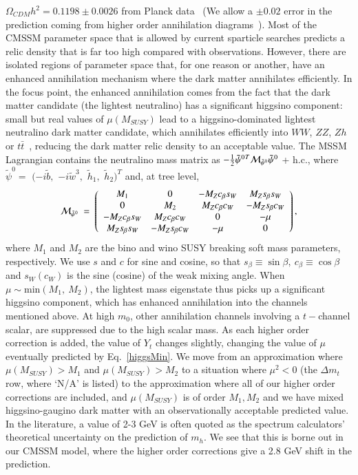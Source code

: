 \documentclass[final,3p,times,pdflatex]{elsarticle}
\begin{document}
$\Omega_{CDM} h^2=0.1198 \pm 0.0026$ from Planck data~\cite{Ade:2013zuv} (We
allow a $\pm 0.02$ error in the prediction coming from higher order
annihilation diagrams~\cite{Baro:2009na}).
Most of the CMSSM parameter space that is allowed by current sparticle
searches predicts a relic density that is far too high compared with
observations. However, there are isolated regions of parameter space that, for
one reason or another, have an enhanced annihilation mechanism where the dark
matter annihilates efficiently. In the focus point, the enhanced annihilation
comes from the fact that the dark matter candidate (the lightest neutralino)
has a significant higgsino component: small but real
values of $\mu(M_{SUSY})$ lead to a higgsino-dominated lightest neutralino dark
matter candidate, which annihilates efficiently into $WW$, $ZZ$, $Zh$ or $t
\bar t$~\cite{Feng:2000gh}, reducing the dark matter relic density to an
acceptable value. 
The MSSM Lagrangian contains the neutralino mass matrix as
$-\frac{1}{2}
{\tilde\psi^0}{}^T{\cal M}_{\tilde\psi^0}\tilde\psi^0$ + h.c., where
$\tilde\psi^0 =$ $(-i\tilde b,$ $-i\tilde w^3,$ $\tilde h_1,$ $\tilde
h_2)^T$ and, at tree level,
%
\begin{equation}
{\cal M}_{\tilde\psi^0} \ =\ \left(\begin{array}{cccc} M_1 & 0 &
-M_Zc_\beta s_W & M_Zs_\beta s_W \\ 0 & M_2 & M_Zc_\beta c_W &
-M_Zs_\beta c_W \\ -M_Zc_\beta s_W & M_Zc_\beta c_W & 0 & -\mu \\
M_Zs_\beta s_W & -M_Zs_\beta c_W & -\mu & 0
\end{array} \right),\label{mchi0}
\end{equation}
%
where $M_1$ and $M_2$ are the bino and wino SUSY breaking soft mass
parameters, respectively.
We use $s$ and $c$ for sine and cosine, so that
$s_\beta\equiv\sin\beta,\ c_{\beta}\equiv\cos\beta$ and $s_W (c_W)$ is
the sine (cosine) of the weak mixing angle. When $\mu \sim \text{min}(M_1,\
M_2)$, 
the lightest mass eigenstate thus picks up a significant higgsino component, 
which has enhanced annihilation into the channels mentioned above. At high
$m_0$, other annihilation channels involving a $t-$channel scalar, are 
suppressed due to the high scalar mass. 
As each higher order correction is added, the value of $Y_t$ changes slightly,
changing the value of $\mu$ eventually predicted by Eq.~\ref{higgsMin}. 
We move from an approximation where $\mu(M_{SUSY}) > M_1$ and $\mu(M_{SUSY}) >
M_2$ to a situation where $\mu^2<0$ (the $\Delta m_t$ row, where `N/A' is
listed) to the approximation where all of our higher order corrections are
included, and $\mu(M_{SUSY})$ is of order $M_1, M_2$ and we have mixed
higgsino-gaugino dark matter with an observationally acceptable predicted value.
In the literature,  a value of 2-3 GeV is often quoted as the spectrum
calculators' theoretical uncertainty on the prediction of $m_h$. We see that
this is borne out in our CMSSM model, where the higher order corrections give
a 2.8 GeV shift in the prediction.
\end{document}
